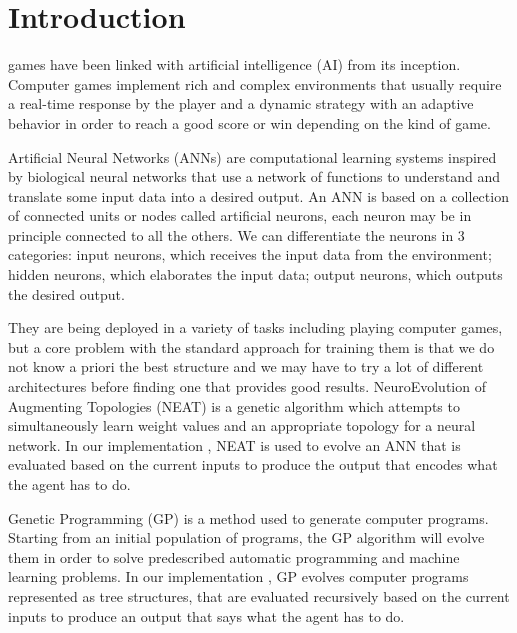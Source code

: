 \section{Introduction}
% 
% 
% 
% 
 games have been linked with artificial intelligence (AI) from its inception.
Computer games implement rich and complex environments that usually require a real-time
response by the player and a dynamic strategy with an adaptive behavior in order to reach a
good score or win depending on the kind of game.


Artificial Neural Networks (ANNs) are computational learning systems inspired by biological
neural networks that use a network of functions to understand and translate some input data
into a desired output. An ANN is based on a collection of connected units or nodes called
artificial neurons, each neuron may be in principle connected to all the others. We can
differentiate the neurons in 3 categories: input neurons, which receives the input data from 
the environment; hidden neurons, which elaborates the input data; output neurons, which outputs the desired output.

They are being deployed in a variety of tasks including playing computer games, but a core
problem with the standard approach for training them is that we do not know a priori the best
structure and we may have to try a lot of different architectures before finding one that
provides good results. NeuroEvolution of Augmenting Topologies (NEAT) \cite{NEAT} is a genetic
algorithm which attempts to simultaneously learn weight values and an appropriate topology
for a neural network. In our implementation \cite{repository}, NEAT is used to evolve an ANN that is
evaluated based on the current inputs to produce the output that encodes what the agent has to do.

Genetic Programming (GP) \cite{GP} is a method used to generate computer programs. Starting
from an initial population of programs, the GP algorithm will evolve them in order to solve
predescribed automatic programming and machine learning problems. In our implementation
\cite{repository}, GP evolves computer programs represented as tree structures, that are evaluated
recursively based on the current inputs to produce an output that says what the agent has to do.

